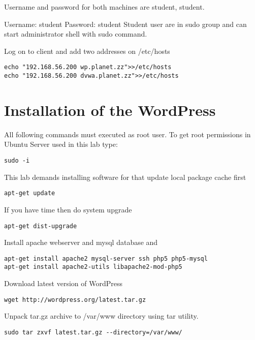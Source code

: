 Username and password for both machines are student, student.

Username: student
Password: student
Student user are in sudo group and can start administrator shell with sudo command.

Log on to client and add two addresses on /etc/hosts
\begin{verbatim}
echo "192.168.56.200 wp.planet.zz">>/etc/hosts
echo "192.168.56.200 dvwa.planet.zz">>/etc/hosts
\end{verbatim}

\section{Installation of the WordPress}
All following commands must executed as root user. To get root permissions in Ubuntu Server used in this lab type:


\begin{verbatim}
sudo -i
\end{verbatim}



This lab demands installing software for that update local package cache first


\begin{verbatim}
apt-get update\end{verbatim}

If you have time then do system upgrade
\begin{verbatim}
apt-get dist-upgrade\end{verbatim}

Install apache webserver and mysql database and 
\begin{verbatim}
apt-get install apache2 mysql-server ssh php5 php5-mysql 
apt-get install apache2-utils libapache2-mod-php5
\end{verbatim}

Download latest version of WordPress
\begin{verbatim}
wget http://wordpress.org/latest.tar.gz
\end{verbatim}

Unpack tar.gz archive to  /var/www directory using tar utility.

\begin{verbatim}
sudo tar zxvf latest.tar.gz --directory=/var/www/
\end{verbatim}


